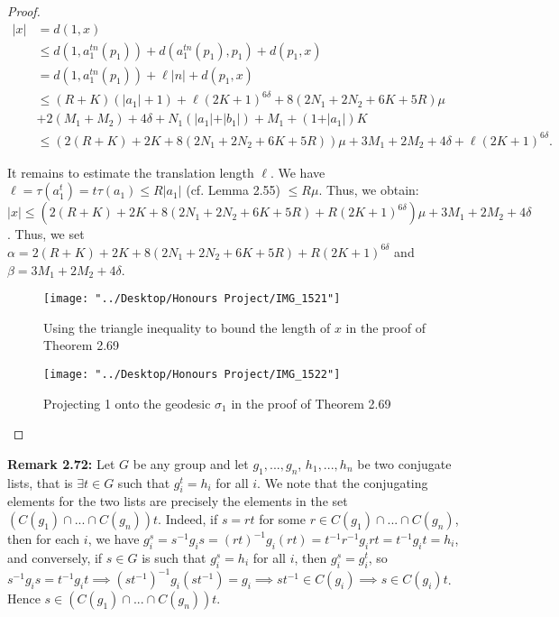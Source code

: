 \documentclass[12pt]{article}
\begin{document}
\begin{proof}
		\begin{align*}
		\vert x \vert &= d(1,x) \\
		&\leq d(1, a_1^{tn}(p_1)) + d(a_1^{tn}(p_1), p_1) + d(p_1, x) \\
		&= d(1, a_1^{tn}(p_1)) + \ell \vert n \vert + d(p_1, x) \\
		&\leq (R + K)(\vert a_1 \vert + 1) + \ell (2K + 1)^{6 \delta} + 8(2N_1 + 2N_2 + 6K + 5R)\mu \\
		&+ 2(M_1 + M_2) + 4 \delta + N_1 (\vert a_1 \vert + \vert b_1 \vert) + M_1 + (1 + \vert a_1 \vert)K \\
		&\leq (2(R + K) + 2K + 8(2N_1 + 2N_2 + 6K + 5R))\mu + 3M_1 + 2M_2 + 4\delta + \ell(2K + 1)^{6 \delta}. 
		\end{align*}
		
		It remains to estimate the translation length $\ell$. We have $\ell = \tau(a_1^t) = t \tau(a_1) \leq R \vert a_1 \vert$ (cf. Lemma 2.55) $\leq R \mu$. Thus, we obtain: $\vert x \vert \leq (2(R + K) + 2K + 8(2N_1 + 2N_2 + 6K + 5R) + R(2K+1)^{6 \delta})\mu + 3M_1 + 2M_2 + 4 \delta$. Thus, we set $\alpha = 2(R + K) + 2K + 8(2N_1 + 2N_2 + 6K + 5R) + R(2K+1)^{6 \delta}$ and $\beta = 3M_1 + 2M_2 + 4 \delta$. 
		
\begin{figure} [H]
	\centering
	\texttt{[image: "../Desktop/Honours Project/IMG\_1521"]}
	\caption{Using the triangle inequality to bound the length of $x$ in the proof of Theorem 2.69}
	\label{fig:img1521}
\end{figure}

\begin{figure} [H]
	\centering
	\texttt{[image: "../Desktop/Honours Project/IMG\_1522"]}
	\caption{Projecting 1 onto the geodesic $\sigma_1$ in the proof of Theorem 2.69}
	\label{fig:img1522}
\end{figure}

		
		
	\end{proof}
	
	\textbf{Remark 2.72: } Let $G$ be any group and let $g_1,...,g_n$, $h_1,...,h_n$ be two conjugate lists, that is $\exists t \in G$ such that $g_i^t = h_i$ for all $i$. We note that the conjugating elements for the two lists are precisely the elements in the set $(C(g_1) \cap ... \cap C(g_n))t$. Indeed, if $s = rt$ for some $r \in C(g_1) \cap ... \cap C(g_n)$, then for each $i$, we have $g_i^s = s^{-1} g_i s = (rt)^{-1} g_i (rt) = t^{-1} r^{-1} g_i r t = t^{-1} g_i t = h_i$, and conversely, if $s \in G$ is such that $g_i^s = h_i$ for all $i$, then $g_i^s = g_i^t$, so $s^{-1} g_i s = t^{-1} g_i t \implies (st^{-1})^{-1} g_i (st^{-1}) = g_i \implies st^{-1} \in C(g_i) \implies s \in C(g_i)t$. Hence $s \in (C(g_1) \cap ... \cap C(g_n))t$. 
	
\end{document}
